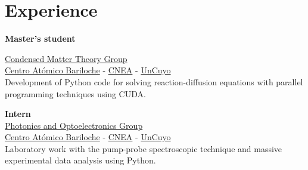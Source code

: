 \documentclass[a4paper,10pt]{article}
\begin{document}
%
%
%
\hfill
\begin{adjustbox}{valign=t}
\begin{minipage}{0.02\textwidth} %
\MyVerticalRule  %
\end{minipage}
\end{adjustbox}
\hfill
%
\begin{adjustbox}{valign=t}
\begin{minipage}{0.5\textwidth} %
\section*{Experience}
\begin{description}
\raggedright
\item[\normalfont \textcolor{ColorOne}{Aug. 2021 -- Dec. 2022.}] \textbf{Master's student}\\ \medskip

\href{https://fisica.cab.cnea.gov.ar/solidos/}{\textcolor{ColorTwo}{Condensed Matter Theory Group}} \\ 
\href{https://fisica.cab.cnea.gov.ar/}{\textcolor{ColorTwo}{Centro Atómico Bariloche}} 
\textcolor{ColorTwo}{-} \href{https://www.argentina.gob.ar/cnea}{\textcolor{ColorTwo}{CNEA}} \textcolor{ColorTwo}{-}
\href{https://www.uncuyo.edu.ar/}{\textcolor{ColorTwo}{UnCuyo}}\\

Development of Python code for solving reaction-diffusion equations with parallel programming techniques using CUDA. 

\item[\normalfont \textcolor{ColorOne}{May. 2021 -- Sep. 2021.}] \textbf{Intern}\\ \medskip
\href{https://fisica.cab.cnea.gov.ar/pop/}{\textcolor{ColorTwo}{Photonics and Optoelectronics Group}}\\	
\href{https://fisica.cab.cnea.gov.ar/}{\textcolor{ColorTwo}{Centro Atómico Bariloche}} 
\textcolor{ColorTwo}{-} \href{https://www.argentina.gob.ar/cnea}{\textcolor{ColorTwo}{CNEA}} \textcolor{ColorTwo}{-}
\href{https://www.uncuyo.edu.ar/}{\textcolor{ColorTwo}{UnCuyo}}\\
Laboratory work with the pump-probe spectroscopic technique and massive experimental data analysis using Python.


\end{description}
\end{minipage}
\end{adjustbox}
\end{document}
